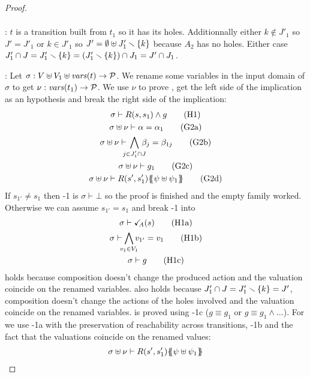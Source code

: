 \documentclass{article}
\begin{document}
\begin{proof}
\begin{gather}
	\end{gather}
\item[\goal{0'}:] \(t\) is a transition built from \(t_1\) so it has its holes.
	Additionnally either \(k \notin J'_1\) so \(J' = J'_1\) or \(k \in J'_1\) so \(J' = \emptyset \uplus J'_1 \smallsetminus {\left\{k\right\}}\) because \(A_2\) has no holes.
	Either case \(J'_1 \cap J = J'_1 \smallsetminus {\left\{k\right\}} = {\left(J'_1 \smallsetminus {\left\{k\right\}}\right)} \cap J_1 = J' \cap J_1\).
\item[\goal{2}:] Let \(\sigma: V \uplus V_1 \uplus \mathit{vars}{\left(t\right)} \to \mathcal{P}\).
	We rename some variables in the input domain of \(\sigma\) to get \(\nu: \mathit{vars}{\left(t_1\right)} \to \mathcal{P}\).
	We use \(\nu\) to prove , get the left side of the implication as an hypothesis and break the right side of the implication:
	\begin{gather}
		\sigma \vdash R\mpar{s, s_1} \wedge g \hyp{1} \\
		\sigma \uplus \nu \vdash \alpha = \alpha_1 \goal{2a} \\
		\sigma \uplus \nu \vdash \bigwedge_\subbox{j \in J'_1 \cap J} \beta_j = \beta_{1j} \goal{2b} \\
		\sigma \uplus \nu \vdash g_1 \goal{2c} \\
		\sigma \uplus \nu \vdash R\mpar{s', s'_1}\psubst{\psi \uplus \psi_1} \goal{2d}
	\end{gather}
	If \(s_{1'} \neq s_1\) then \hyp{1} is \(\sigma \vdash \bot\) so the proof is finished and the empty family worked.
	Otherwise we can assume \(s_{1'} = s_1\) and break \hyp{1} into
	\begin{gather}
		\sigma \vdash \reach{A}\mpar{s} \hyp{1a} \\
		\sigma \vdash \bigwedge_\subbox{v_1 \in V_1} v_{1'} = v_1 \hyp{1b} \\
		\sigma \vdash g \hyp{1c}
	\end{gather}
	 holds because composition doesn't change the produced action and the valuation coincide on the renamed variables.
	 also holds because \(J'_1 \cap J = J'_1 \smallsetminus {\left\{k\right\}} = J'\), composition doesn't change the actions of the holes involved and the valuation coincide on the renamed variables.
	 is proved using \hyp{1c} (\(g \equiv g_1\) or \(g \equiv g_1 \wedge \dots\)).
	For  we use \hyp{1a} with the preservation of reachability across transitions, \hyp{1b} and the fact that the valuations coincide on the renamed values:
	\begin{align*}
		& \sigma \uplus \nu \vdash R\mpar{s', s'_1}\psubst{\psi \uplus \psi_1} \\

\end{align*}
\end{proof}
\end{document}
